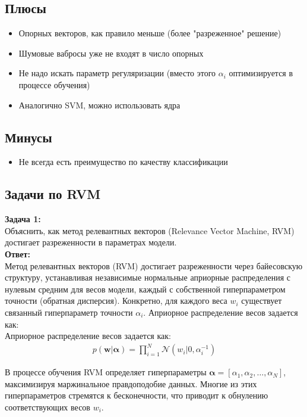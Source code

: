\subsection*{Плюсы}
\begin{itemize}
    \item Опорных векторов, как правило меньше (более "разреженное" решение)
    \item Шумовые вабросы уже не входят в число опорных
    \item Не надо искать параметр регуляризации (вместо этого $\alpha_i$ оптимизируется в процессе обучения)
    \item Аналогично SVM, можно использовать ядра
\end{itemize}

\subsection*{Минусы}
\begin{itemize}
    \item Не всегда есть преимущество по качеству классификации
\end{itemize}

\subsection{Задачи по RVM}
\textbf{Задача 1:}\\
Объяснить, как метод релевантных векторов (Relevance Vector Machine, RVM) достигает разреженности в параметрах модели.  \\
\textbf{Ответ:}\\
Метод релевантных векторов (RVM) достигает разреженности через байесовскую структуру, устанавливая независимые нормальные априорные распределения с нулевым средним для весов модели, каждый с собственной гиперпараметром точности (обратная дисперсия). Конкретно, для каждого веса $w_i$ существует связанный гиперпараметр точности $\alpha_i$.
Априорное распределение весов задается как:\\
Априорное распределение весов задается как:
\begin{align*}
    p(\mathbf{w} | \boldsymbol{\alpha}) = \prod_{i=1}^N \mathcal{N}(w_i | 0, \alpha_i^{-1})
\end{align*}

В процессе обучения RVM определяет гиперпараметры  $\boldsymbol{\alpha} = [\alpha_1, \alpha_2, \dots, \alpha_N]$, максимизируя маржинальное правдоподобие данных. Многие из этих гиперпараметров стремятся к бесконечности, что приводит к обнулению соответствующих весов $ w_i$.

